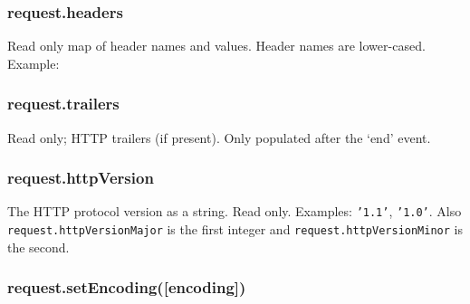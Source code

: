 \begin{Shaded}
\begin{Highlighting}[]
\NormalTok{(}\NormalTok{, }\NormalTok{)}
\NormalTok{\{ }\NormalTok{: }\NormalTok{,}
  \NormalTok{: }\NormalTok{,}
  \NormalTok{: \{ }\NormalTok{: } \NormalTok{\},}
  \NormalTok{: } \NormalTok{\}}
\end{Highlighting}
\end{Shaded}

\subsubsection{request.headers}

Read only map of header names and values. Header names are lower-cased.
Example:

\begin{Shaded}
\begin{Highlighting}[]
\CommentTok{//}
\NormalTok{(}\NormalTok{);}
\end{Highlighting}
\end{Shaded}

\subsubsection{request.trailers}

Read only; HTTP trailers (if present). Only populated after the `end'
event.

\subsubsection{request.httpVersion}

The HTTP protocol version as a string. Read only. Examples:
\texttt{'1.1'}, \texttt{'1.0'}. Also \texttt{request.httpVersionMajor}
is the first integer and \texttt{request.httpVersionMinor} is the
second.

\subsubsection{request.setEncoding({[}encoding{]})}

